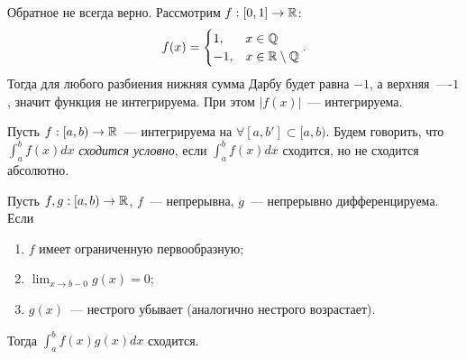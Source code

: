 \documentclass[../main.tex]{subfiles}
\begin{document}
  \begin{example}
    Обратное не всегда верно. Рассмотрим $f:[0,1] \to \mathbb{R}$: 
    \begin{gather} 
      f(x) = \begin{cases}1, &x\in\mathbb{Q} \\ -1, &x \in \mathbb{R} \setminus \mathbb{Q}\end{cases} .
    \end{gather} 
    Тогда для любого разбиения нижняя сумма Дарбу будет равна $-1$, а верхняя~----$1$, значит функция не интегрируема. При этом $ \left| f(x)  \right| $~--- интегрируема.
  \end{example}

  \begin{definition}
    Пусть $f:[a,b) \to \mathbb{R}$~--- интегрируема на $\forall [a, b'] \subset [a, b)$. Будем говорить, что $\int_{a}^{b} f(x) dx$ \emph{сходится условно}, если $\int_{a}^{b} f(x) dx$ сходится, но не сходится абсолютно.    
  \end{definition}

  \begin{theorem}
    Пусть $f,g: [a,b) \to \mathbb{R}$, $f$~--- непрерывна, $g$~--- непрерывно дифференцируема. Если
    \begin{enumerate}
      \item $f$ имеет ограниченную первообразную;
      \item $\lim_{x \to b-0} g(x) = 0$;
      \item $ g(x) $~--- нестрого убывает (аналогично нестрого возрастает). 
    \end{enumerate}  
    Тогда $\int_{a}^{b} f(x) g(x) dx$ сходится. 
  \end{theorem}
  
\end{document}
